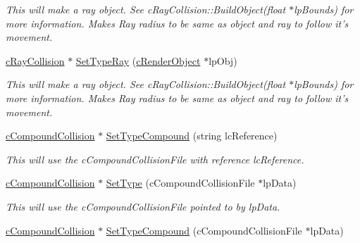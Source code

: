 \begin{DoxyCompactItemize}
\begin{DoxyCompactList}\small\item\em This will make a ray object. See cRayCollision::BuildObject(float $\ast$lpBounds) for more information. Makes Ray radius to be same as object and ray to follow it's movement. \end{DoxyCompactList}\item 
\hypertarget{classc_collision_object_ac28c6d5fff668bb3429de93909dd643d}{
\hyperlink{classc_ray_collision}{cRayCollision} $\ast$ \hyperlink{classc_collision_object_ac28c6d5fff668bb3429de93909dd643d}{SetTypeRay} (\hyperlink{classc_render_object}{cRenderObject} $\ast$lpObj)}
\label{classc_collision_object_ac28c6d5fff668bb3429de93909dd643d}

\begin{DoxyCompactList}\small\item\em This will make a ray object. See cRayCollision::BuildObject(float $\ast$lpBounds) for more information. Makes Ray radius to be same as object and ray to follow it's movement. \end{DoxyCompactList}\item 
\hypertarget{classc_collision_object_a647e170fc428c65d2795658ec737dee0}{
\hyperlink{classc_compound_collision}{cCompoundCollision} $\ast$ \hyperlink{classc_collision_object_a647e170fc428c65d2795658ec737dee0}{SetTypeCompound} (string lcReference)}
\label{classc_collision_object_a647e170fc428c65d2795658ec737dee0}

\begin{DoxyCompactList}\small\item\em This will use the cCompoundCollisionFile with reference lcReference. \end{DoxyCompactList}\item 
\hypertarget{classc_collision_object_a3621925675923227a484860b5c38f017}{
\hyperlink{classc_compound_collision}{cCompoundCollision} $\ast$ \hyperlink{classc_collision_object_a3621925675923227a484860b5c38f017}{SetType} (cCompoundCollisionFile $\ast$lpData)}
\label{classc_collision_object_a3621925675923227a484860b5c38f017}

\begin{DoxyCompactList}\small\item\em This will use the cCompoundCollisionFile pointed to by lpData. \end{DoxyCompactList}\item 
\hypertarget{classc_collision_object_a2ef3e85552221a2a33356e6f36cfe070}{
\hyperlink{classc_compound_collision}{cCompoundCollision} $\ast$ \hyperlink{classc_collision_object_a2ef3e85552221a2a33356e6f36cfe070}{SetTypeCompound} (cCompoundCollisionFile $\ast$lpData)}
\label{classc_collision_object_a2ef3e85552221a2a33356e6f36cfe070}


\end{DoxyCompactItemize}
